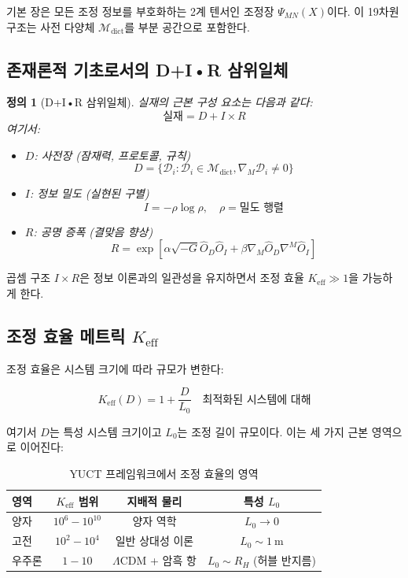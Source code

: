 \documentclass[11pt,a4paper]{article}
\newcommand{\Mdict}{\mathcal{M}_{\text{dict}}}
\newcommand{\Dict}{\mathcal{D}}
\newtheorem{definition}[theorem]{정의}
\theoremstyle{remark}
\newcommand{\Keff}{K_{\mathrm{eff}}}
\begin{document}
	기본 장은 모든 조정 정보를 부호화하는 2계 텐서인 조정장 $\Psi_{MN}(X)$이다. 이 19차원 구조는 사전 다양체 $\Mdict$를 부분 공간으로 포함한다.
	
	\subsection{존재론적 기초로서의 D+I•R 삼위일체}
	
	\begin{definition}[D+I•R 삼위일체]
		실재의 근본 구성 요소는 다음과 같다:
		\[
		\text{실재} = D + I \times R
		\]
		여기서:
		\begin{itemize}
			\item $D$: 사전장 (잠재력, 프로토콜, 규칙)
			\[
			D = \{\Dict_i : \Dict_i \in \Mdict, \nabla_M \Dict_i \neq 0\}
			\]
			\item $I$: 정보 밀도 (실현된 구별)
			\[
			I = -\rho \log \rho, \quad \rho = \text{밀도 행렬}
			\]
			\item $R$: 공명 증폭 (결맞음 향상)
			\[
			R = \exp\left[\alpha \sqrt{-G} \hat{O}_D \hat{O}_I + \beta \nabla_M\hat{O}_D \nabla^M\hat{O}_I\right]
			\]
		\end{itemize}
	\end{definition}
	
	곱셈 구조 $I \times R$은 정보 이론과의 일관성을 유지하면서 조정 효율 $\Keff \gg 1$을 가능하게 한다.
	
	\subsection[조정 효율 메트릭 K eff]{조정 효율 메트릭 $\Keff$}
	
	조정 효율은 시스템 크기에 따라 규모가 변한다:
	
	\begin{equation}
		\Keff(D) = 1 + \frac{D}{L_0} \quad \text{최적화된 시스템에 대해}
	\end{equation}
	
	여기서 $D$는 특성 시스템 크기이고 $L_0$는 조정 길이 규모이다. 이는 세 가지 근본 영역으로 이어진다:
	
	\begin{table}[htbp]
		\centering
		\begin{tabular}{lccc}
			\toprule
			\textbf{영역} & \textbf{$\Keff$ 범위} & \textbf{지배적 물리} & \textbf{특성 $L_0$} \\
			\midrule
			양자 & $10^6 - 10^{10}$ & 양자 역학 & $L_0 \to 0$ \\
			고전 & $10^2 - 10^4$ & 일반 상대성 이론 & $L_0 \sim 1\ \text{m}$ \\
			우주론 & $1 - 10$ & $\Lambda$CDM + 암흑 항 & $L_0 \sim R_H$ (허블 반지름) \\
			\bottomrule
		\end{tabular}
		\caption{YUCT 프레임워크에서 조정 효율의 영역}
		\label{tab:keff-regimes}
	\end{table}
	
\end{document}
